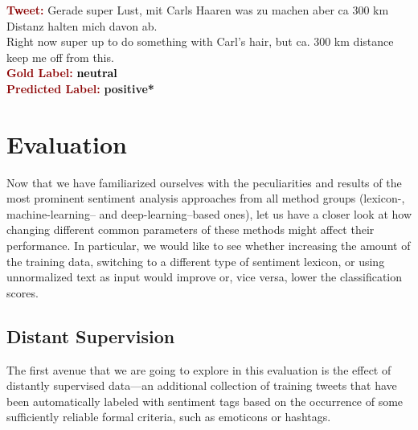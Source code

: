 \begin{example}\label{snt:cgsa:exmp:lba-error}
  \noindent\textup{\bfseries\textcolor{darkred}{Tweet:}} {\upshape
    \colorbox{green!0.5!blue!0.4}{Gerade} \colorbox{green!89}{super} \colorbox{blue!0.3}{Lust}, mit \colorbox{white!2}{Carls} Haaren \colorbox{white!0.6}{was} zu \colorbox{green!1}{machen} \colorbox{green!0.3}{aber} \colorbox{white!2}{ca} 300 \colorbox{white!1}{km}
    \colorbox{white!1}{Distanz} halten \colorbox{blue!0.3}{mich} davon \colorbox{white!1}{ab}.}\\
  \noindent \colorbox{green!0.5!blue!0.4}{Right now} \colorbox{green!89}{super} \colorbox{blue!0.3}{up to} \colorbox{green!1}{do} \colorbox{white!0.6}{something} with \colorbox{white!2}{Carl}'s hair, \colorbox{green!0.3}{but} \colorbox{white!2}{ca.} 300 \colorbox{white!1}{km}
  \colorbox{white!1}{distance} keep \colorbox{blue!0.3}{me} \colorbox{white!1}{off} from this.\\[\exampleSep]
  \noindent\textup{\bfseries\textcolor{darkred}{Gold Label:}}\hspace*{4.3em}\textbf{%
    \upshape\textcolor{black}{neutral}}\\
 \noindent\textup{\bfseries\textcolor{darkred}{Predicted Label:}}\hspace*{2em}\textbf{%
    \upshape\textcolor{green3}{positive*}}
\end{example}


\section{Evaluation}

Now that we have familiarized ourselves with the peculiarities and
results of the most prominent sentiment analysis approaches from all
method groups (lexicon-, machine-learning-- and deep-learning--based
ones), let us have a closer look at how changing different common
parameters of these methods might affect their performance.  In
particular, we would like to see whether increasing the amount of the
training data, switching to a different type of sentiment lexicon, or
using unnormalized text as input would improve or, vice versa, lower
the classification scores.

\subsection{Distant Supervision}

The first avenue that we are going to explore in this evaluation is
the effect of distantly supervised data---an additional collection of
training tweets that have been automatically labeled with sentiment
tags based on the occurrence of some sufficiently reliable formal
criteria, such as emoticons or hashtags.

